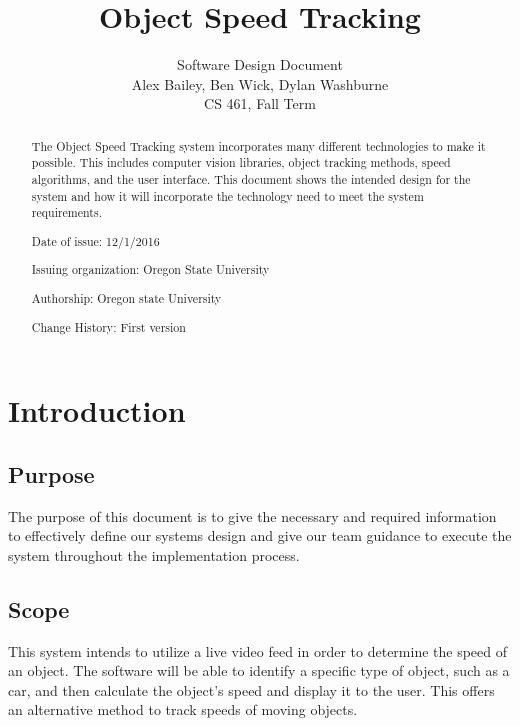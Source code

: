 \documentclass[letterpaper,10pt,onecolumn,draftclsnofoot]{IEEEtran}
\title{Object Speed Tracking}
\author{Software Design Document\\Alex Bailey, Ben Wick, Dylan Washburne\\CS 461, Fall Term}
\begin{document}
\begin{titlepage}

\maketitle

\begin{abstract}
The Object Speed Tracking system incorporates many different technologies to make it possible.
This includes computer vision libraries, object tracking methods, speed algorithms, and the user interface.
This document shows the intended design for the system and how it will incorporate the technology need to meet the system requirements.

\vspace*{\fill}

Date of issue: 12/1/2016

Issuing organization: Oregon State University 

Authorship: Oregon state University 

Change History: First version 


 
\end{abstract}

\end{titlepage}

\tableofcontents
\newpage


\section{Introduction}
\subsection{Purpose}
The purpose of this document is to give the necessary and required information to effectively define our systems design and give our team guidance to execute the system throughout the implementation process.

\subsection{Scope}
This system intends to utilize a live video feed in order to determine the speed of an object.
The software will be able to identify a specific type of object, such as a car, and then calculate the object's speed and display it to the user.
This offers an alternative method to track speeds of moving objects.
\end{document}
